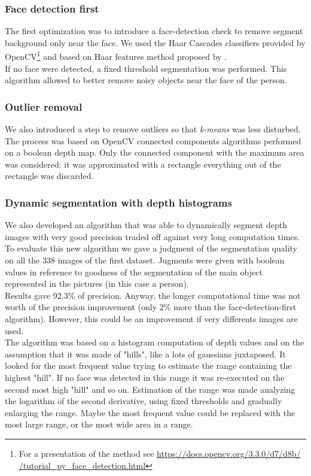 \documentclass{article}
\begin{document}
\subsubsection{Face detection first}
The first optimization was to introduce a face-detection check to remove
segment background only near the face. We used the Haar Cascades classifiers
provided by OpenCV\footnote{For a presentation of the method see \href{https://docs.opencv.org/3.3.0/d7/d8b/tutorial_py_face_detection.html}{https://docs.opencv.org/3.3.0/d7/d8b/\\
/tutorial\_py\_face\_detection.html}}
and based on Haar features method proposed by \citep{ViolaJones}.
\\
If no face were detected, a fixed threshold segmentation was performed.
This algorithm allowed to better remove noisy objects near the face of
the person.

\subsubsection{Outlier removal}
We also introduced a step to remove outliers so that \textit{k-means} was
less disturbed. The process was based on OpenCV connected components
algorithms performed on a boolean depth map. Only the connected component
with the maximum area was considered: it was approximated with a rectangle
everything out of the rectangle was discarded.

\subsubsection{Dynamic segmentation with depth histograms}
We also developed an algorithm that was able to dynamically segment depth
images with very good precision traded off against very long computation times.
\\
To evaluate this new algorithm we gave a judgment of the segmentation
quality on all the 338 images of the first dataset. Jugments were given
with boolean values in reference to goodness of the segmentation of the main
object represented in the pictures (in this case a person).
\\
Results gave 92.3\% of precision. Anyway, the longer computational time was not
worth of the precision improvement (only 2\% more than the face-detection-first
algorithm). However, this could be an improvement if very differents images
are used.
\\
The algorithm was based on a histogram computation of depth values and on the
assumption that it was made of "hills", like a lots of gaussians juxtaposed. It
looked for the most frequent value trying to estimate the range containing the
highest "hill". If no face was detected in this range it was re-executed on the
second most high "hill" and so on. Estimation of the range was made analyzing
the logarithm of the second derivative, using fixed thresholds and gradually
enlarging the range. Maybe the most frequent value could be replaced with the
most large range, or the most wide area in a range.
\end{document}
